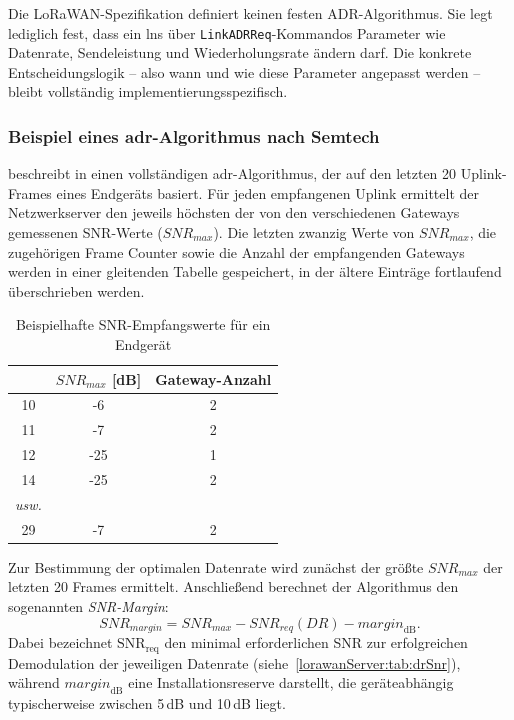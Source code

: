 	Die LoRaWAN-Spezifikation definiert keinen festen ADR-Algorithmus. Sie legt lediglich fest, dass ein \ac{lns} über \texttt{LinkADRReq}-Kommandos Parameter wie Datenrate, Sendeleistung und Wiederholungsrate ändern darf. Die konkrete Entscheidungslogik – also wann und wie diese Parameter angepasst werden – bleibt vollständig implementierungsspezifisch.

\subsubsection{Beispiel eines \ac{adr}-Algorithmus nach Semtech}
	
	\textcite{Semtech:2016} beschreibt in  einen vollständigen \ac{adr}-Algorithmus, 
	der auf den letzten 20 Uplink-Frames eines Endgeräts basiert. Für jeden empfangenen Uplink ermittelt der Netzwerkserver den jeweils höchsten der von den verschiedenen Gateways gemessenen SNR-Werte (\(SNR_{max}\)). Die letzten zwanzig Werte von \(SNR_{max}\), die zugehörigen Frame Counter sowie die Anzahl der empfangenden Gateways werden in einer gleitenden Tabelle gespeichert, in der ältere Einträge fortlaufend überschrieben werden.
	
	\begin{table}[H]
		\centering
		\begin{tabular}{|c|c|c|}
			\hline
			\textbf{\PYTHON{FCnt}} & \textbf{\(SNR_{max}\) [dB]} & \textbf{Gateway-Anzahl} \\
			\hline
			10 & -6  & 2 \\
			\hline
			11 & -7  & 2 \\
			\hline
			12 & -25 & 1 \\
			\hline
			14 & -25 & 2 \\
			\hline
			\textit{usw.} & & \\
			\hline
			29 & -7  & 2 \\
			\hline
		\end{tabular}
		\caption{Beispielhafte SNR-Empfangswerte für ein Endgerät}
	\end{table}
	
	Zur Bestimmung der optimalen Datenrate wird zunächst der grö{\ss}te \(SNR_{max}\) der letzten 20 Frames ermittelt. Anschlie{\ss}end berechnet der Algorithmus den sogenannten \textit{SNR-Margin}:
	\[
	{SNR}_{{margin}} =
	{SNR}_{{max}} - {SNR}_{{req}}({DR}) - {margin}_{\mathrm{dB}}.
	\]
	Dabei bezeichnet \(\text{SNR}_{\text{req}}\) den minimal erforderlichen SNR zur erfolgreichen Demodulation der jeweiligen Datenrate (siehe~\autoref{lorawanServer:tab:drSnr}), während \({margin}_{\mathrm{dB}}\) eine Installationsreserve darstellt, die geräteabhängig typischerweise zwischen 5\,dB und 10\,dB liegt.
	
